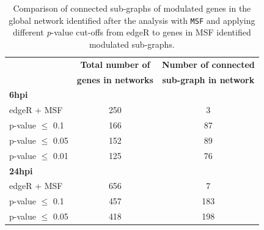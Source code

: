 \documentclass[10pt,a4paper,twocolumn]{article}
\begin{document}
	
	
	\begin{table}[]
		\centering
		\caption{Comparison of connected sub-graphs of modulated genes
			in the global network identified after the analysis with
			\texttt{MSF} and applying different \textit{p}-value cut-offs from edgeR to genes in MSF identified modulated sub-graphs. }
		\label{tab:rawVsHartung}
		\begin{tabular}{lll}
			\hline
			\multicolumn{1}{|l|}{}                            & \multicolumn{1}{c|}{\textbf{Total number of}}       & \multicolumn{1}{c|}{\textbf{Number of connected}}      \\
			\multicolumn{1}{|l|}{}                            & \multicolumn{1}{c|}{\textbf{genes in networks}}      & \multicolumn{1}{c|}{\textbf{sub-graph in network}}     \\ \hline
			\multicolumn{1}{|l|}{\textbf{6hpi}}               & \multicolumn{1}{l|}{}                                                & \multicolumn{1}{c|}{}                 \\ \hline
			\multicolumn{1}{|l|}{edgeR + MSF}                 & \multicolumn{1}{c|}{250}                                             & \multicolumn{1}{c|}{3}                \\ \hline
			\multicolumn{1}{|l|}{p-value $\leq$ 0.1}  & \multicolumn{1}{c|}{166}                                             & \multicolumn{1}{c|}{87}               \\ \hline
			\multicolumn{1}{|l|}{p-value $\leq$ 0.05} & \multicolumn{1}{c|}{152}                                             & \multicolumn{1}{c|}{89}               \\ \hline
			\multicolumn{1}{|l|}{p-value $\leq$ 0.01} & \multicolumn{1}{c|}{125}                                             & \multicolumn{1}{c|}{76}               \\ \hline
			\multicolumn{1}{|l|}{\textbf{24hpi}}              & \multicolumn{1}{c|}{}                                                & \multicolumn{1}{c|}{}                 \\ \hline
			\multicolumn{1}{|l|}{edgeR + MSF}                 & \multicolumn{1}{c|}{656}                                             & \multicolumn{1}{c|}{7}                \\ \hline
			\multicolumn{1}{|l|}{p-value $\leq$ 0.1}  & \multicolumn{1}{c|}{457}                                             & \multicolumn{1}{c|}{183}               \\ \hline
			\multicolumn{1}{|l|}{p-value $\leq$ 0.05} & \multicolumn{1}{c|}{418}                                             & \multicolumn{1}{c|}{198}              \\ \hline

\end{tabular}
\end{table}
\end{document}
